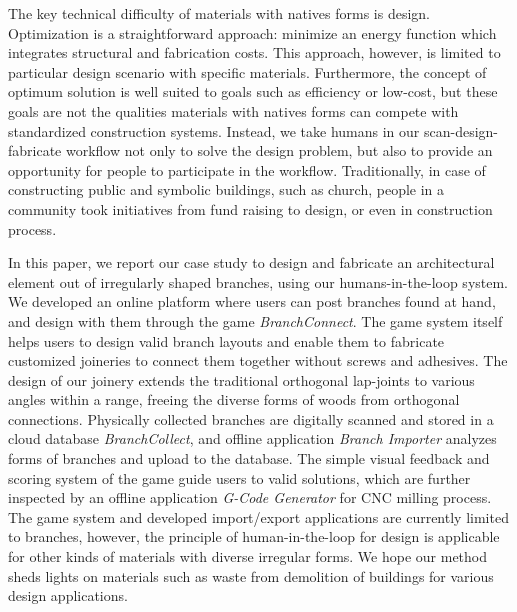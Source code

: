 The key technical difficulty of materials with natives forms is design.
Optimization is a straightforward approach: minimize an energy function which integrates structural and fabrication costs.
This approach, however, is limited to particular design scenario with specific materials.
Furthermore, the concept of optimum solution is well suited to goals such as efficiency or low-cost, but these goals are not the qualities materials with natives forms can compete with standardized construction systems.
Instead, we take humans in our scan-design-fabricate workflow not only to solve the design problem, but also to provide an opportunity for people to participate in the workflow.
Traditionally, in case of constructing public and symbolic buildings, such as church, people in a community took initiatives from fund raising to design, or even in construction process.




In this paper, we report our case study to design and fabricate an architectural element out of irregularly shaped branches, using our humans-in-the-loop system.
We developed an online platform where users can post branches found at hand, and design with them through the game \textit{BranchConnect}.
The game system itself helps users to design valid branch layouts and enable them to fabricate customized joineries to connect them together without screws and adhesives.
The design of our joinery extends the traditional orthogonal lap-joints to various angles within a range, freeing the diverse forms of woods from orthogonal connections.
Physically collected branches are digitally scanned and stored in a cloud database \textit{BranchCollect}, and offline application \textit{Branch Importer} analyzes forms of branches and upload to the database.
The simple visual feedback and scoring system of the game guide users to valid solutions, which are further inspected by an offline application \textit{G-Code Generator} for CNC milling process.
The game system and developed import/export applications are currently limited to branches, however, the principle of human-in-the-loop for design is applicable for other kinds of materials with diverse irregular forms.
We hope our method sheds lights on materials such as waste from demolition of buildings for various design applications.

